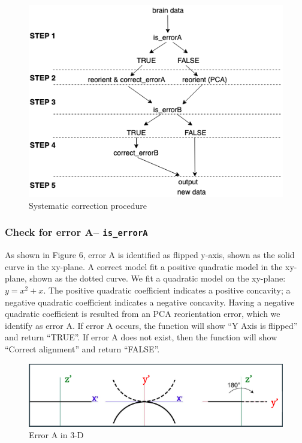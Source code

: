 \documentclass[10pt,letterpaper]{article}
\begin{document}
\begin{figure}[H]
\includegraphics[width=0.9\linewidth]{visualization_paper/Cranium_procedure} \caption{Systematic correction procedure}\label{fig:Figure5}
\end{figure}

\hypertarget{check-for-error-a-is_errora}{%
\subsubsection{\texorpdfstring{Check for error A--
\texttt{is\_errorA}}{Check for error A-- is\_errorA}}\label{check-for-error-a-is_errora}}

As shown in Figure 6, error A is identified as flipped y-axis, shown as
the solid curve in the xy-plane. A correct model fit a positive
quadratic model in the xy-plane, shown as the dotted curve. We fit a
quadratic model on the xy-plane: \(y=x^2 + x\). The positive quadratic
coefficient indicates a positive concavity; a negative quadratic
coefficient indicates a negative concavity. Having a negative quadratic
coefficient is resulted from an PCA reorientation error, which we
identify as error A. If error A occurs, the function will show ``Y Axis
is flipped'' and return ``TRUE''. If error A does not exist, then the
function will show ``Correct alignment'' and return ``FALSE''.

\begin{figure}[H]
\includegraphics[width=0.9\linewidth]{visualization_paper/error_correctionA} \caption{Error A in 3-D}\label{fig:Figure6}
\end{figure}
\end{document}
